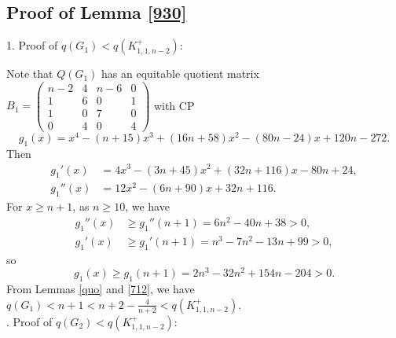 \documentclass[12pt]{article}
\begin{document}
\begin{appendices}


\section{Proof of Lemma \ref{930}}

1. Proof of $q(G_1)<q(K_{1,1,n-2}^+)$:

Note that $Q(G_1)$ has an equitable quotient matrix
$B_1=\left(
\begin{smallmatrix}
n-2 &  4  & n-6 & 0 \\
1   &  6  & 0   & 1 \\
1   &  0  & 7   & 0 \\
0   &  4  & 0   & 4
\end{smallmatrix}\right)$
with CP
\[
g_1(x)=x^4 - ( n + 15)x^3 + (16n + 58)x^2 -(80n-24 )x + 120n - 272.
\]
Then
\begin{align*}
g_1'(x)&=4x^3-(3n + 45)x^2 + (32n + 116)x - 80n + 24,\\
g_1''(x)&=12x^2 - ( 6n+ 90)x + 32n + 116.
\end{align*}
For $x\ge n+1$, as $n\ge 10$, we have
\begin{align*}
g_1''(x)&\ge g_1''(n+1)=6n^2 - 40n + 38>0,\\
g_1'(x)&\ge g_1'(n+1)=n^3 - 7n^2 - 13n + 99>0,
\end{align*}
so
\[
g_1(x)\ge g_1(n+1)=2n^3 - 32n^2 + 154n - 204>0.
\]
From Lemmas \ref{quo} and \ref{712}, we have $q(G_1)<n+1<n+2-\frac{4}{n+2}<q(K_{1,1,n-2}^+)$.\\


. Proof of $q(G_2)<q(K_{1,1,n-2}^+)$:


\end{appendices}
\end{document}
